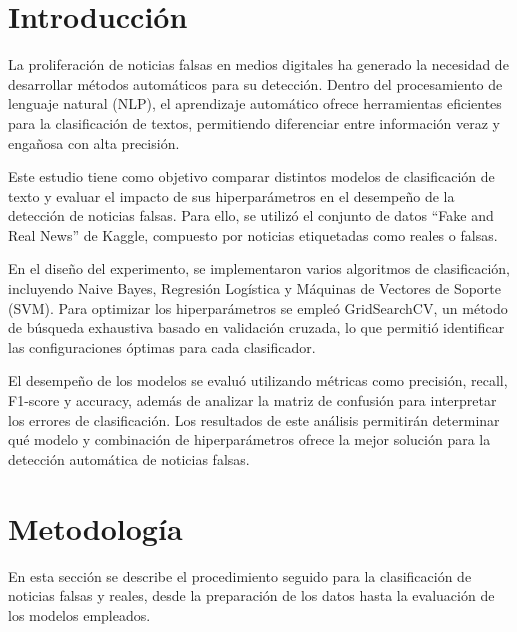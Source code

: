 \documentclass[journal]{IEEEtran}
\begin{document}



\section{Introducción}
% 
% 
% 
% 
\IEEEPARstart
{L}{a} proliferación de noticias falsas en medios digitales ha generado la necesidad de desarrollar métodos automáticos para su detección. Dentro del procesamiento de lenguaje natural (NLP), el aprendizaje automático ofrece herramientas eficientes para la clasificación de textos, permitiendo diferenciar entre información veraz y engañosa con alta precisión.

Este estudio tiene como objetivo comparar distintos modelos de clasificación de texto y evaluar el impacto de sus hiperparámetros en el desempeño de la detección de noticias falsas. Para ello, se utilizó el conjunto de datos “Fake and Real News” de Kaggle, compuesto por noticias etiquetadas como reales o falsas.

En el diseño del experimento, se implementaron varios algoritmos de clasificación, incluyendo Naive Bayes, Regresión Logística y Máquinas de Vectores de Soporte (SVM). Para optimizar los hiperparámetros se empleó GridSearchCV, un método de búsqueda exhaustiva basado en validación cruzada, lo que permitió identificar las configuraciones óptimas para cada clasificador.

El desempeño de los modelos se evaluó utilizando métricas como precisión, recall, F1-score y accuracy, además de analizar la matriz de confusión para interpretar los errores de clasificación. Los resultados de este análisis permitirán determinar qué modelo y combinación de hiperparámetros ofrece la mejor solución para la detección automática de noticias falsas.

\section{Metodología}
En esta sección se describe el procedimiento seguido para la clasificación de noticias falsas y reales, desde la preparación de los datos hasta la evaluación de los modelos empleados.
\end{document}
